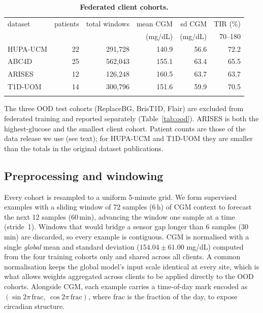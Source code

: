 \documentclass[10pt,letterpaper]{article}
\newlength\savedwidth
\newcommand\thickhline{\noalign{\global\savedwidth\arrayrulewidth\global\arrayrulewidth 2pt}%
\hline
\noalign{\global\arrayrulewidth\savedwidth}}
\begin{document}
\begin{table}[!ht]
\centering
\captionsetup{justification=centering,singlelinecheck=on}
\caption{\bf Federated client cohorts.}
\label{tab:datasets}
\begin{tabular}{lrrrrr}
\thickhline
dataset & patients & total windows & mean CGM & sd CGM & TIR (\%) \\
        &          &               & (mg/dL)  & (mg/dL) & 70--180  \\
\hline
HUPA-UCM & 22 & 291,728 & 140.9 & 56.6 & 72.2 \\
ABC4D    & 25 & 562,043 & 155.1 & 63.4 & 65.5 \\
ARISES   & 12 & 126,248 & 160.5 & 63.7 & 63.7 \\
T1D-UOM  & 14 & 300,796 & 151.6 & 59.9 & 70.5 \\
\thickhline
\end{tabular}
\begin{center}
{\small The three OOD test cohorts (ReplaceBG, BrisT1D, Flair) are excluded from
federated training and reported separately (Table~\ref{tab:ood}). ARISES is both the
highest-glucose and the smallest client cohort. Patient counts are those of the
data release we use (see text); for HUPA-UCM and T1D-UOM they are smaller than
the totals in the original dataset publications.}
\end{center}
\end{table}

\subsection*{Preprocessing and windowing}

Every cohort is resampled to a uniform 5-minute grid. We form supervised
examples with a sliding window of 72 samples (6\,h) of CGM context to forecast
the next 12 samples (60\,min), advancing the window one sample at a time
(stride~1). Windows that would bridge a sensor gap longer than 6 samples
(30\,min) are discarded, so every example is contiguous. CGM is normalised with
a single \emph{global} mean and standard deviation ($154.04 \pm 61.00$ mg/dL)
computed from the four training cohorts only and shared
across all clients. A common
normalisation keeps the global model's input scale identical at every site,
which is what allows weights aggregated across clients to be applied directly to
the OOD cohorts. Alongside CGM,
each example carries a time-of-day mark encoded
as $(\sin 2\pi\,\mathrm{frac},\ \cos 2\pi\,\mathrm{frac})$, where $\mathrm{frac}$
is the fraction of the day, to expose circadian structure.
\end{document}
